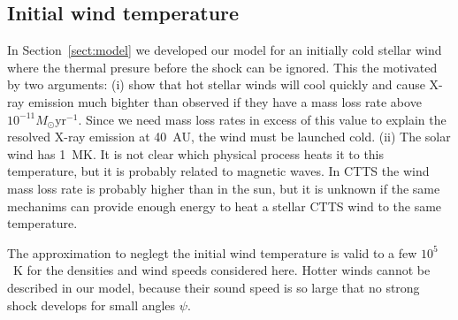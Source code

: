 \subsection{Initial wind temperature}
\label{sect:T_0}
In Section~\ref{sect:model} we developed our model for an initially cold stellar wind where the thermal presure before the shock can be ignored. This the motivated by two arguments: (i) \citet{2007IAUS..243..299M} show that hot stellar winds will cool quickly and cause X-ray emission much bighter than observed if they have a mass loss rate above $10^{-11}M_\odot\mathrm{ yr}^{-1}$. Since we need mass loss rates in excess of this value to explain the resolved X-ray emission at 40~AU, the wind must be launched cold. (ii) The solar wind has 1~MK. It is not clear which physical process heats it to this temperature, but it is probably related to magnetic waves. In CTTS the wind mass loss rate is probably higher than in the sun, but it is unknown if the same mechanims can provide enough energy to heat a stellar CTTS wind to the same temperature.

The approximation to neglegt the initial wind temperature is valid to a few $10^5$~K for the densities and wind speeds considered here. Hotter winds cannot be described in our model, because their sound speed is so large that no strong shock develops for small angles $\psi$.